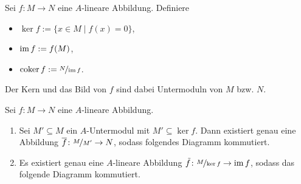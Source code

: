 \documentclass[12pt,a4paper]{scrartcl}
\theoremstyle{cplain}
\theoremstyle{cdef}
\begin{document}
\begin{defi}
	Sei $f\colon M\to N$ eine $A$-lineare Abbildung. Definiere
	\begin{itemize}
		\item $\ker f := \{x\in M\mid f(x) = 0\}$,
		\item $\operatorname{im} f := f(M)$,
		\item $\operatorname{coker} f := \nicefrac{N}{\operatorname{im} f}$.
	\end{itemize}
	Der Kern und das Bild von $f$ sind dabei Untermoduln von $M$ bzw. $N$.
\end{defi}
\begin{lem}
	Sei $f\colon M\to N$ eine $A$-lineare Abbildung.
	\begin{enumerate}
        \item \label{lem:homsatz moduln:i} Sei $M'\subseteq M$ ein $A$-Untermodul mit $M'\subseteq \ker f$. Dann existiert genau eine Abbildung $\overline{f}\colon \nicefrac{M}{M'}\to N$, sodass folgendes Diagramm kommutiert.
        \begin{center}
        \end{center}
        \item \label{lem:homsatz moduln:ii} Es existiert genau eine $A$-lineare Abbildung $\tilde{f}\colon \nicefrac{M}{\operatorname{ker} f}\to \operatorname{im} f$, sodass das folgende Diagramm kommutiert.
        \begin{center}
        \end{center}
	\end{enumerate}
\end{lem}
\end{document}
